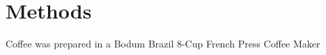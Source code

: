 \section{Methods}
\begin{outline}[enumerate]
\1 Coffee was prepared in a Bodum Brazil 8-Cup French Press Coffee Maker
\end{outline}

